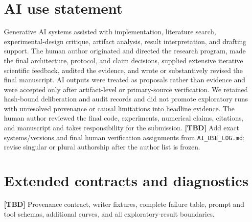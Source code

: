 \documentclass{article}
\newcommand{\tbd}{\textbf{[TBD]}}
\begin{document}
\section*{AI use statement}
Generative AI systems assisted with implementation, literature search,
experimental-design critique, artifact analysis, result interpretation, and
drafting support. The human author originated and directed the research
program, made the final architecture, protocol, and claim decisions, supplied
extensive iterative scientific feedback, audited the evidence, and wrote or
substantively revised the final manuscript. AI outputs were treated as
proposals rather than evidence and were accepted only after artifact-level or
primary-source verification. We retained hash-bound deliberation and audit
records and did not promote exploratory runs with unresolved provenance or
causal limitations into headline evidence. The human author reviewed the final
code, experiments, numerical claims, citations, and manuscript and takes
responsibility for the submission. \tbd{} Add exact systems/versions and final
human verification assignments from \texttt{AI_USE_LOG.md}; revise singular or
plural authorship after the author list is frozen.




\appendix
\section{Extended contracts and diagnostics}
\tbd{} Provenance contract, writer fixtures, complete failure table, prompt
and tool schemas, additional curves, and all exploratory-result boundaries.
\end{document}
